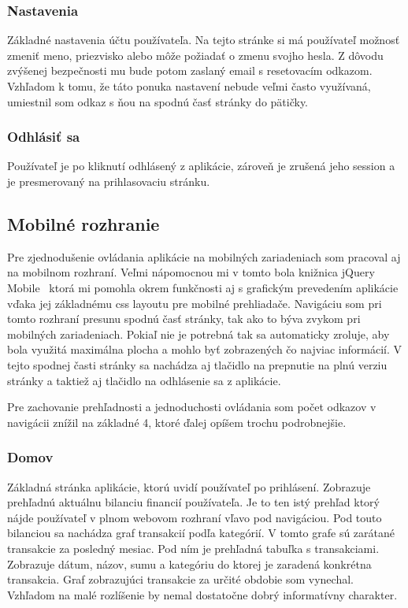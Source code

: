 \documentclass[12pt,oneside]{book}
\begin{document}
\subsubsection{Nastavenia}

Základné nastavenia účtu používateľa. Na tejto stránke si má používateľ možnosť zmeniť meno, priezvisko alebo môže požiadať o zmenu svojho hesla. Z dôvodu zvýšenej bezpečnosti mu bude potom zaslaný email s resetovacím odkazom. Vzhľadom k tomu, že táto ponuka nastavení nebude veľmi často využívaná, umiestnil som odkaz s ňou na spodnú časť stránky do pätičky. 

\subsubsection{Odhlásiť sa}

Používateľ je po kliknutí odhlásený z aplikácie, zároveň je zrušená jeho session a je presmerovaný na prihlasovaciu stránku.

\subsection{Mobilné rozhranie}
Pre zjednodušenie ovládania aplikácie na mobilných zariadeniach som pracoval aj na mobilnom rozhraní. Veľmi nápomocnou mi v tomto bola knižnica jQuery Mobile \cite{jQueryMobile}\, ktorá mi pomohla okrem funkčnosti aj s grafickým prevedením aplikácie vďaka jej základnému css layoutu pre mobilné prehliadače. Navigáciu som pri tomto rozhraní presunu spodnú časť stránky, tak ako to býva zvykom pri mobilných zariadeniach. Pokiaľ nie je potrebná tak sa automaticky zroluje, aby bola využitá maximálna plocha a mohlo byť zobrazených čo najviac informácií. V tejto spodnej časti stránky sa nachádza aj tlačidlo na prepnutie na plnú verziu stránky a taktiež aj tlačidlo na odhlásenie sa z aplikácie. 

Pre zachovanie prehľadnosti a jednoduchosti ovládania som počet odkazov v navigácii znížil na základné 4, ktoré ďalej opíšem trochu podrobnejšie. 

\subsubsection{Domov}
Základná stránka aplikácie, ktorú uvidí používateľ po prihlásení. Zobrazuje prehľadnú aktuálnu bilanciu financií používateľa. Je to ten istý prehľad ktorý nájde používateľ v plnom webovom rozhraní  vľavo pod navigáciou. Pod touto bilanciou sa nachádza graf transakcií podľa kategórií. V tomto grafe sú zarátané transakcie za posledný mesiac. Pod ním je prehľadná tabuľka s transakciami. Zobrazuje dátum, názov, sumu a kategóriu do ktorej je zaradená konkrétna transakcia. Graf zobrazujúci transakcie za určité obdobie som vynechal. Vzhľadom na malé rozlíšenie by nemal dostatočne dobrý informatívny charakter.
\end{document}
